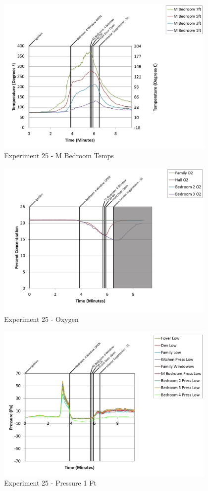 \documentclass{article}
\begin{document}
\begin{appendices}
\clearpage

\begin{figure}[h!]
	\centering
	\includegraphics[height=3.05in]{0_Images/Results_Charts/Exp_25_Charts/MBedroomTemps.png}
	\caption{Experiment 25 - M Bedroom Temps}
\end{figure}


\begin{figure}[h!]
	\centering
	\includegraphics[height=3.05in]{0_Images/Results_Charts/Exp_25_Charts/Oxygen.png}
	\caption{Experiment 25 - Oxygen}
\end{figure}

\clearpage

\begin{figure}[h!]
	\centering
	\includegraphics[height=3.05in]{0_Images/Results_Charts/Exp_25_Charts/Pressure1Ft.png}
	\caption{Experiment 25 - Pressure 1 Ft}
\end{figure}



\end{appendices}
\end{document}
